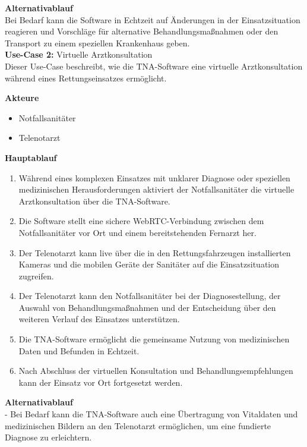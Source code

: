 \textbf{Alternativablauf}\\
Bei Bedarf kann die Software in Echtzeit auf Änderungen in der Einsatzsituation reagieren und Vorschläge für alternative Behandlungsmaßnahmen oder den Transport zu einem speziellen Krankenhaus geben.\\

\textbf{Use-Case 2:} Virtuelle Arztkonsultation \\

Dieser Use-Case beschreibt, wie die TNA-Software eine virtuelle Arztkonsultation während eines Rettungseinsatzes ermöglicht.

\textbf{Akteure}\\

\begin{itemize}
    \item Notfallsanitäter
    \item Telenotarzt
\end{itemize}

\textbf{Hauptablauf}\\

\begin{enumerate}
\item Während eines komplexen Einsatzes mit unklarer Diagnose oder speziellen medizinischen Herausforderungen aktiviert der Notfallsanitäter die virtuelle Arztkonsultation über die TNA-Software.
\item Die Software stellt eine sichere WebRTC-Verbindung zwischen dem Notfallsanitäter vor Ort und einem bereitstehenden Fernarzt her.
\item Der Telenotarzt kann live über die in den Rettungsfahrzeugen installierten Kameras und die mobilen Geräte der Sanitäter auf die Einsatzsituation zugreifen.
\item Der Telenotarzt kann den Notfallsanitäter bei der Diagnosestellung, der Auswahl von Behandlungsmaßnahmen und der Entscheidung über den weiteren Verlauf des Einsatzes unterstützen.
\item Die TNA-Software ermöglicht die gemeinsame Nutzung von medizinischen Daten und Befunden in Echtzeit.
\item Nach Abschluss der virtuellen Konsultation und Behandlungsempfehlungen kann der Einsatz vor Ort fortgesetzt werden. 
\end{enumerate}

\textbf{Alternativablauf}\\
- Bei Bedarf kann die TNA-Software auch eine Übertragung von Vitaldaten und medizinischen Bildern an den Telenotarzt ermöglichen, um eine fundierte Diagnose zu erleichtern.\\

